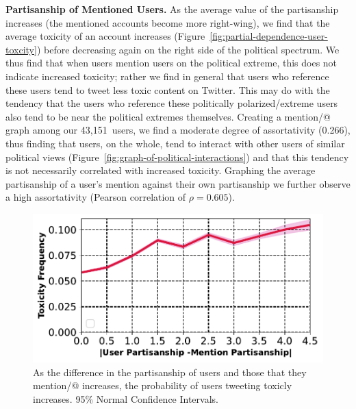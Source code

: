 \vspace{2pt}\noindent
\noindent
\textbf{Partisanship of Mentioned Users.} As the average value of the partisanship increases (the mentioned accounts become more right-wing), we find that the average toxicity of an account increases (Figure~\ref{fig:partial-dependence-user-toxcity}) before decreasing again on the right side of the political spectrum. We thus find that when users mention users on the political extreme, this does not indicate increased toxicity; rather we find in general that users who reference these users tend to tweet less toxic content on Twitter. This may do with the tendency that the users who reference these politically polarized/extreme users also tend to be near the political extremes themselves. Creating a mention/@  graph among our 43,151~users, we find a moderate degree of assortativity (0.266), thus finding that users, on the whole, tend to interact with other users of similar political views (Figure~\ref{fig:graph-of-political-interactions}) and that this tendency is not necessarily correlated with increased toxicity.  Graphing the average partisanship of a user's mention against their own partisanship we further observe a high assortativity (Pearson correlation of $\rho=0.605$). 
\begin{figure}
\begin{minipage}[l]{0.48\textwidth}
\includegraphics[width=1\columnwidth]{figures/toxicity_vs_mention-20240428.pdf}
\end{minipage}
\begin{minipage}[l]{0.33\textwidth}
\caption{As the difference in the partisanship of users and those that they mention/@ increases, the probability of users tweeting toxicly increases. 95\% Normal Confidence Intervals.
\label{fig:toxicity_vs_mention-new}}
\end{minipage}
\end{figure}

